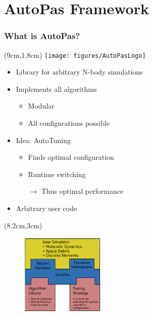 \documentclass[
	10pt,
	t		%
]{beamer}
\begin{document}
\section{AutoPas Framework}

\begin{frame}
    \frametitle{What is AutoPas?}

    \begin{textblock*}{5cm}(9cm,1.8cm)
        \texttt{[image: figures/AutoPasLogo]}
    \end{textblock*}

    \begin{itemize}
        \item Library for arbitrary N-body simulations
        \item Implements all algorithms
              \begin{itemize}
                  \item Modular
                  \item All\textup{\small*} configurations possible
              \end{itemize}
        \item Idea: AutoTuning
              \begin{itemize}
                  \item Finds optimal configuration
                  \item Runtime switching
                  \item[$\rightarrow$] Thus optimal performance
              \end{itemize}
        \item Arbitrary user code
    \end{itemize}

    \begin{textblock*}{4cm}(8.2cm,3cm)
        \begin{figure}
            \includegraphics[width=4cm]{figures/AutoPasLibraryStructure.png}
            \caption{ \scriptsize{\cite{Newcome2023Poster}}}

        \end{figure}
    \end{textblock*}

\end{frame}
\end{document}
